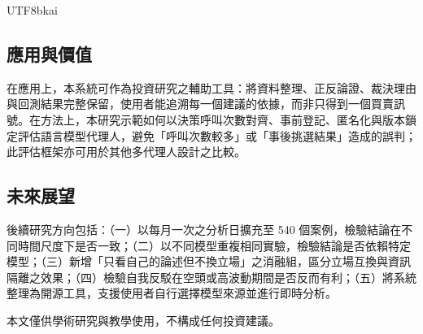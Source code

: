 \documentclass[12pt,a4paper]{article}
\begin{document}
\begin{CJK}{UTF8}{bkai}
\subsection{應用與價值}

在應用上，本系統可作為投資研究之輔助工具：將資料整理、正反論證、裁決理由與回測結果完整保留，使用者能追溯每一個建議的依據，而非只得到一個買賣訊號。在方法上，本研究示範如何以決策呼叫次數對齊、事前登記、匿名化與版本鎖定評估語言模型代理人，避免「呼叫次數較多」或「事後挑選結果」造成的誤判；此評估框架亦可用於其他多代理人設計之比較。

\subsection{未來展望}

後續研究方向包括：（一）以每月一次之分析日擴充至 540 個案例，檢驗結論在不同時間尺度下是否一致；（二）以不同模型重複相同實驗，檢驗結論是否依賴特定模型；（三）新增「只看自己的論述但不換立場」之消融組，區分立場互換與資訊隔離之效果；（四）檢驗自我反駁在空頭或高波動期間是否反而有利；（五）將系統整理為開源工具，支援使用者自行選擇模型來源並進行即時分析。

\vspace{0.8cm}
\noindent\small 本文僅供學術研究與教學使用，不構成任何投資建議。
\normalsize

\clearpage



\end{CJK}
\end{document}
